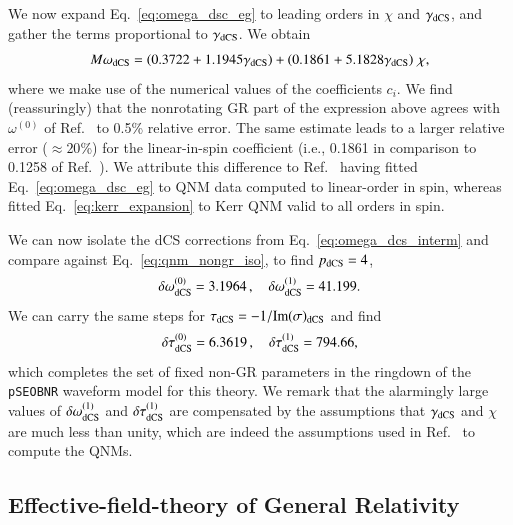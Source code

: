 \documentclass[twocolumn,
               prd,
               aps,
               superscriptaddress,
               tightenlines,
               nofootinbib,
               eqsecnum,
               amsfonts,
               amsmath,
               longbibliography]{revtex4-1}
\newcommand{\pSEOB}{\texttt{pSEOBNR}}
\begin{document}
We now expand Eq.~\eqref{eq:omega_dsc_eg} to leading orders in $\chi$ and $\gamma_{\rm dCS}$, and
gather the terms proportional to $\gamma_{\rm dCS}$.
%
We obtain
%
\begin{align}
    M \omega_{\rm dCS} =
    \left( 0.3722 + 1.1945 \gamma_{\rm dCS} \right)
    + \left(0.1861 + 5.1828 \gamma_{\rm dCS} \right) \, \chi,
    \nonumber \\
    \label{eq:omega_dcs_interm}
\end{align}
%
where we make use of the numerical values of the coefficients $c_{i}$.
%
We find (reassuringly) that the nonrotating GR part of the expression above agrees with $\omega^{(0)}$ of Ref.~\cite{Maselli:2019mjd} to 0.5\% relative error. The same estimate leads to a larger relative error ($\approx 20$\%) for the linear-in-spin coefficient (i.e., 0.1861 in comparison to 0.1258 of Ref.~\cite{Maselli:2019mjd}).
%
We attribute this difference to Ref.~\cite{Wagle:2021tam} having fitted
Eq.~\eqref{eq:omega_dsc_eg} to QNM data computed to linear-order in spin,
whereas~\cite{Maselli:2019mjd} fitted Eq.~\eqref{eq:kerr_expansion} to Kerr QNM
valid to all orders in spin.

We can now isolate the dCS corrections from Eq.~\eqref{eq:omega_dcs_interm} and
compare against Eq.~\eqref{eq:qnm_nongr_iso}, to find
$p_{\rm dCS} = 4$,
%
\begin{equation}
\delta \omega^{(0)}_{\rm dCS} = 3.1964\,, \quad \delta \omega^{(1)}_{\rm dCS} = 41.199.
\label{eq:cs_omega_coefs}
\end{equation}
%
We can carry the same steps for $\tau_{\rm dCS} = - 1 / {\rm Im}(\sigma)_{\rm dCS}$ and find
%
\begin{equation}
\delta \tau^{(0)}_{\rm dCS} = 6.3619\,, \quad \delta \tau^{(1)}_{\rm dCS} = 794.66,
\label{eq:cs_tau_coefs}
\end{equation}
%
which completes the set of fixed non-GR parameters in the ringdown of the \pSEOB{}
waveform model for this theory.
%
We remark that the alarmingly large values of
$\delta \omega_{\rm dCS}^{(1)}$ and $\delta \tau_{\rm dCS}^{(1)}$ are
compensated by the assumptions that $\gamma_{\rm dCS}$ and $\chi$
are much less than unity, which are indeed the assumptions used in Ref.~\cite{Wagle:2021tam}
to compute the QNMs.

\subsection{Effective-field-theory of General Relativity}
\label{app:map_eftofgr}
\end{document}
